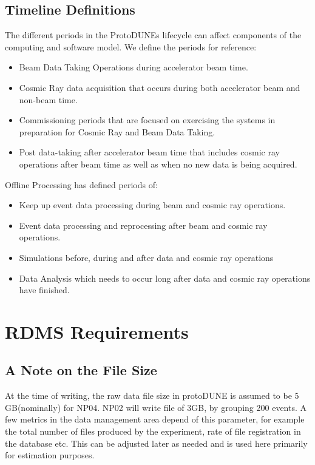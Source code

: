 \documentclass[12pt]{article}
\newcommand{\filesize}{5\,GB\xspace}
\begin{document}
\subsection{Timeline Definitions}

The different periods in the ProtoDUNEs lifecycle can affect components of the computing and software model. We define the periods for reference:

\begin{itemize}
\item  Beam Data Taking Operations during accelerator beam time.
\item  Cosmic Ray data acquisition that occurs during both accelerator beam and non-beam time.
\item Commissioning periods that are focused on exercising the systems in preparation for Cosmic Ray and Beam Data Taking.
\item Post data-taking after accelerator beam time that includes cosmic ray operations after beam time as well as when no new data is being acquired. 
\end{itemize}

Offline Processing has defined periods of:
\begin {itemize} 
\item Keep up event data processing during beam and cosmic ray operations. 
\item Event data processing and reprocessing after beam and cosmic ray operations.
\item Simulations before, during and after data and cosmic ray operations
\item Data Analysis which needs to occur long after data and cosmic ray operations have finished.
\end{itemize}


\section{RDMS Requirements}
\subsection{A Note on the File Size}
At the time of writing, the raw data file size in protoDUNE  is assumed to be \filesize (nominally) for NP04.
NP02 will write file of 3GB, by grouping 200 events. A few metrics in the data management area depend of this
parameter, for example the total number of files produced by the experiment, rate of file registration in the database etc. This can be adjusted
later as needed and is used here primarily for estimation purposes.
\end{document}
